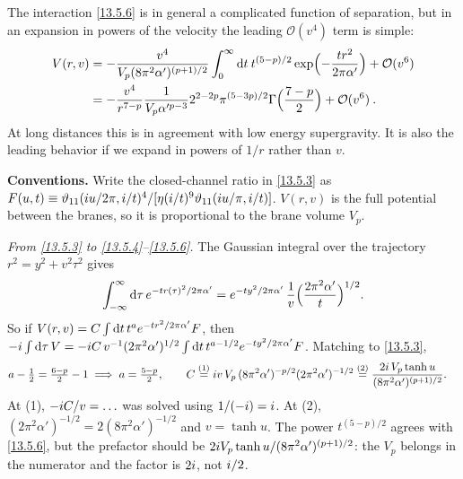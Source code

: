 The interaction \eqref{13.5.6} is in general a complicated function of separation, but in an expansion in powers of the velocity the leading $\mathcal{O}(v^4)$ term is simple:
\begin{align}
	V(r,v) &= -\frac{v^4}{V_p(8\pi^2\alpha')^{(p+1)/2}}\int_0^\infty \mathrm{d} t\:t^{(5-p)/2}\exp\Bigl(-\frac{t r^2}{2\pi\alpha'}\Bigr) + \mathcal{O}(v^6) \nonumber \\
	&= -\frac{v^4}{r^{7-p}}\frac{1}{V_p\alpha'^{p-3}}2^{2-2p}\pi^{(5-3p)/2}\Gamma\Bigl(\frac{7-p}{2}\Bigr) + \mathcal{O}(v^6) \:. \label{13.5.7}
\end{align}
At long distances this is in agreement with low energy supergravity. It is also the leading behavior if we expand in powers of $1/r$ rather than $v$.
\begin{tcolorbox}[breakable]
	\begin{remark}
		\textbf{Conventions.} Write the closed-channel ratio in \eqref{13.5.3} as $F(u,t)\equiv\vartheta_{11}(i u/2\pi,i/t)^4/[\eta(i/t)^9\vartheta_{11}(i u/\pi,i/t)]$. $V(r,v)$ is the full potential between the branes, so it is proportional to the brane volume $V_p$.

		\textit{From \eqref{13.5.3} to \eqref{13.5.4}--\eqref{13.5.6}.} The Gaussian integral over the trajectory $r^2=y^2+v^2\tau^2$ gives
		\begin{equation*}
			\int_{-\infty}^\infty\mathrm{d}\tau\,e^{-tr(\tau)^2/2\pi\alpha'} = e^{-ty^2/2\pi\alpha'}\,\frac1v\Bigl(\frac{2\pi^2\alpha'}{t}\Bigr)^{1/2} .
		\end{equation*}
		So if $V(r,v)=C\int\mathrm{d} t\,t^{a}e^{-tr^2/2\pi\alpha'}F$, then $-i\int\mathrm{d}\tau\,V=-i C\,v^{-1}(2\pi^2\alpha')^{1/2}\int\mathrm{d} t\,t^{a-1/2}e^{-ty^2/2\pi\alpha'}F$. Matching to \eqref{13.5.3},
		\begin{align*}
			a-\tfrac12 &= \tfrac{6-p}{2}-1 \;\Longrightarrow\; a=\tfrac{5-p}{2},\qquad
			C \overset{(1)}{=} i v\,V_p\,(8\pi^2\alpha')^{-p/2}(2\pi^2\alpha')^{-1/2} \overset{(2)}{=} \frac{2i\,V_p\tanh u}{(8\pi^2\alpha')^{(p+1)/2}} .
		\end{align*}
		At (1), $-i C/v=\ldots$ was solved using $1/(-i)=i$. At (2), $(2\pi^2\alpha')^{-1/2}=2(8\pi^2\alpha')^{-1/2}$ and $v=\tanh u$. The power $t^{(5-p)/2}$ agrees with \eqref{13.5.6}, but the prefactor should be $2i V_p\tanh u/(8\pi^2\alpha')^{(p+1)/2}$: the $V_p$ belongs in the numerator and the factor is $2i$, not $i/2$.


\end{remark}
\end{tcolorbox}
